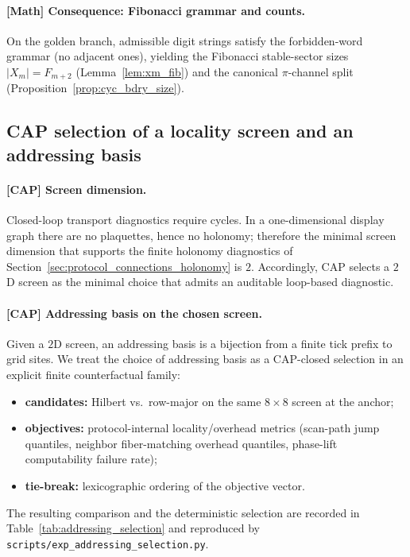 \paragraph{[Math] Consequence: Fibonacci grammar and counts.}
On the golden branch, admissible digit strings satisfy the forbidden-word grammar (no adjacent ones), yielding the Fibonacci stable-sector sizes $|X_m|=F_{m+2}$ (Lemma~\ref{lem:xm_fib}) and the canonical $\pi$-channel split (Proposition~\ref{prop:cyc_bdry_size}).

\subsection{CAP selection of a locality screen and an addressing basis}
\label{subsec:tick_cap_addressing}

\paragraph{[CAP] Screen dimension.}
Closed-loop transport diagnostics require cycles.
In a one-dimensional display graph there are no plaquettes, hence no holonomy; therefore the minimal screen dimension that supports the finite holonomy diagnostics of Section~\ref{sec:protocol_connections_holonomy} is $2$.
Accordingly, CAP selects a $2$D screen as the minimal choice that admits an auditable loop-based diagnostic.

\paragraph{[CAP] Addressing basis on the chosen screen.}
Given a $2$D screen, an addressing basis is a bijection from a finite tick prefix to grid sites.
We treat the choice of addressing basis as a CAP-closed selection in an explicit finite counterfactual family:
\begin{itemize}
\item \textbf{candidates:} Hilbert vs.\ row-major on the same $8\times 8$ screen at the anchor;
\item \textbf{objectives:} protocol-internal locality/overhead metrics (scan-path jump quantiles, neighbor fiber-matching overhead quantiles, phase-lift computability failure rate);
\item \textbf{tie-break:} lexicographic ordering of the objective vector.
\end{itemize}
The resulting comparison and the deterministic selection are recorded in Table~\ref{tab:addressing_selection} and reproduced by \texttt{scripts/exp\_addressing\_selection.py}.

